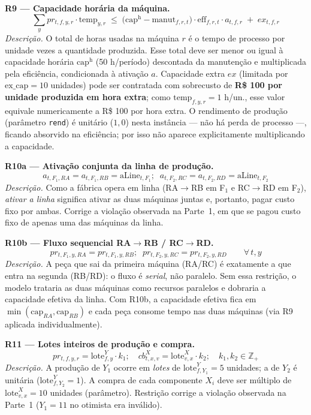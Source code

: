 \documentclass[11pt,a4paper]{article}
\begin{document}
\medskip
\noindent\textbf{R9 — Capacidade horária da máquina.}
\begin{equation}
\sum_{y} pr_{t,f,y,r}\cdot \text{temp}_{y,r} \;\leq\; \bigl(\text{cap}^{\text{h}} - \text{manut}_{f,r,t}\bigr)\cdot \text{eff}_{f,r,t}\cdot a_{t,f,r} \;+\; ex_{t,f,r}
\label{eq:R9}
\end{equation}
\emph{Descrição.} O total de horas usadas na máquina $r$ é o tempo de processo por unidade vezes a quantidade produzida. Esse total deve ser menor ou igual à capacidade horária $\text{cap}^{\text{h}}$ (50 h/período) descontada da manutenção e multiplicada pela eficiência, condicionada à ativação $a$. Capacidade extra $ex$ (limitada por $\text{ex\_cap} = 10$ unidades) pode ser contratada com sobrecusto de \textbf{R\$ 100 por unidade produzida em hora extra}; como $\text{temp}_{f,y,r} = 1$ h/un., esse valor equivale numericamente a R\$ 100 por hora extra. O rendimento de produção (parâmetro \texttt{rend}) é unitário ($1,0$) nesta instância --- não há perda de processo ---, ficando absorvido na eficiência; por isso não aparece explicitamente multiplicando a capacidade.

\medskip
\noindent\textbf{R10a — Ativação conjunta da linha de produção.}
\begin{equation}
a_{t,F_1,RA} = a_{t,F_1,RB} = \text{aLine}_{t,F_1};\;\; a_{t,F_2,RC} = a_{t,F_2,RD} = \text{aLine}_{t,F_2}
\label{eq:R10a}
\end{equation}
\emph{Descrição.} Como a fábrica opera em linha (RA$\to$RB em F$_1$ e RC$\to$RD em F$_2$), \emph{ativar a linha} significa ativar as duas máquinas juntas e, portanto, pagar custo fixo por ambas. Corrige a violação observada na Parte~1, em que se pagou custo fixo de apenas uma das máquinas da linha.

\medskip
\noindent\textbf{R10b — Fluxo sequencial RA$\to$RB / RC$\to$RD.}
\begin{equation}
pr_{t,F_1,y,RA} = pr_{t,F_1,y,RB};\;\; pr_{t,F_2,y,RC} = pr_{t,F_2,y,RD} \qquad \forall\,t,y
\label{eq:R10b}
\end{equation}
\emph{Descrição.} A peça que sai da primeira máquina (RA/RC) é exatamente a que entra na segunda (RB/RD): o fluxo é \emph{serial}, não paralelo. Sem essa restrição, o modelo trataria as duas máquinas como recursos paralelos e dobraria a capacidade efetiva da linha. Com R10b, a capacidade efetiva fica em $\min(\text{cap}_{RA},\text{cap}_{RB})$ e cada peça consome tempo nas duas máquinas (via R9 aplicada individualmente).

\medskip
\noindent\textbf{R11 — Lotes inteiros de produção e compra.}
\begin{equation}
pr_{t,f,y,r} = \text{lote}^Y_{f,y}\cdot k_1; \quad cb^X_{t,x,v} = \text{lote}^X_{v,x}\cdot k_2; \quad k_1,k_2 \in \mathbb{Z}_+
\label{eq:R11}
\end{equation}
\emph{Descrição.} A produção de $Y_1$ ocorre em \emph{lotes} de $\text{lote}^Y_{f,Y_1} = 5$ unidades; a de $Y_2$ é unitária ($\text{lote}^Y_{f,Y_2}=1$). A compra de cada componente $X_i$ deve ser múltiplo de $\text{lote}^X_{v,x} = 10$ unidades (parâmetro). Restrição corrige a violação observada na Parte~1 ($Y_1 = 11$ no otimista era inválido).
\end{document}
